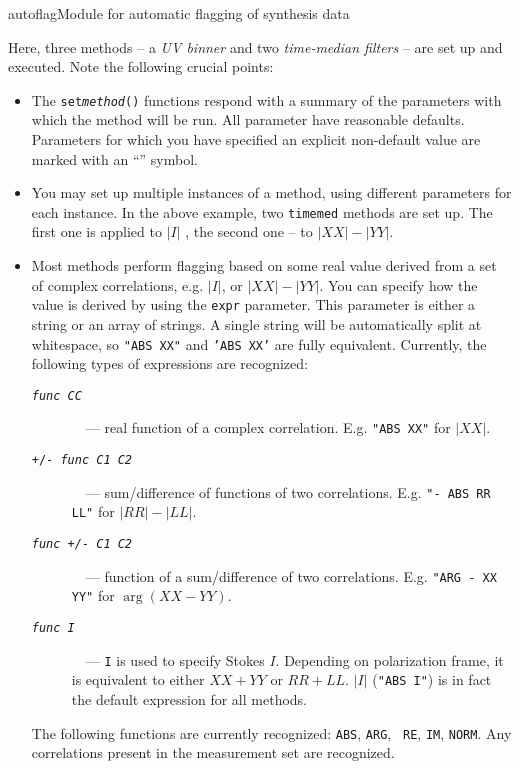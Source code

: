 \begin{ahmodule}{autoflag}{Module for automatic flagging of synthesis data}
\begin{ahdescription}
Here, three methods -- a {\em UV binner} and two {\em time-median filters} --
 are set up and executed. Note the following crucial points:

\begin{itemize} 

\item The {\tt set{\em method}\/()} functions respond with a summary of the
parameters with which the method will be run. All parameter have reasonable
defaults. Parameters for which you have specified an explicit non-default 
value are marked with an ``{\tt *}'' symbol.

\item You may set up multiple instances of a method, using different 
parameters for each instance. In the above example, two {\tt timemed} methods
 are set up.
The first one is applied to $|I|$ , the second one -- to $|XX|-|YY|$.

\item Most methods perform flagging based on some real value derived from a set
of complex correlations, e.g. $|I|$, or $|XX|-|YY|$. You can specify how the
value is derived by using the {\tt expr} parameter. This parameter is either a
string or an array of strings. A single string will be automatically split at
whitespace, so {\tt "ABS XX"} and {\tt 'ABS XX'} are fully equivalent.
Currently, the following types of expressions are recognized: 

\begin{description}
\item[{\tt\em func CC}]~~--- real function of a complex correlation. E.g. {\tt "ABS XX"} for
$|XX|$.

\item[{\tt +/-\em\ func C1 C2}]~~--- sum/difference of functions of two correlations. E.g. 
{\tt "- ABS RR LL"} for $|RR|-|LL|$.

\item[{\tt\em func\tt\ +/-\em\ C1 C2}]~~--- function of a sum/difference of 
two correlations. E.g.
{\tt "ARG - XX YY"} for $\arg({XX-YY})$.

\item[{\tt\em func\tt\ I}]~~--- {\tt I} is used to specify Stokes $I$. 
Depending on polarization frame, it is equivalent to either $XX+YY$ or $RR+LL$.
$|I|$ ({\tt "ABS I"}) is in fact the default expression for all methods.

\end{description}

The following functions are currently recognized: {\tt ABS}, {\tt ARG}, {\tt
RE}, {\tt IM}, {\tt NORM}. Any correlations present in the measurement set are
recognized. 


\end{itemize}
\end{ahdescription}
\end{ahmodule}
